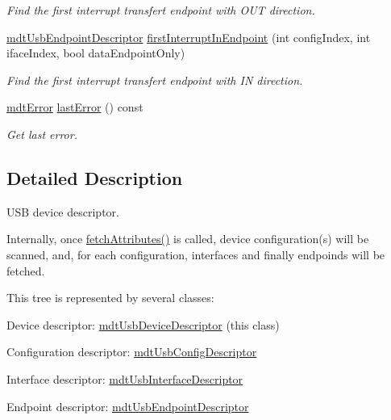 \begin{DoxyCompactItemize}
\begin{DoxyCompactList}\small\item\em Find the first interrupt transfert endpoint with O\-U\-T direction. \end{DoxyCompactList}\item 
\hyperlink{classmdt_usb_endpoint_descriptor}{mdt\-Usb\-Endpoint\-Descriptor} \hyperlink{classmdt_usb_device_descriptor_a0b3d8ac4414e2caec9d1fc81cba223f4}{first\-Interrupt\-In\-Endpoint} (int config\-Index, int iface\-Index, bool data\-Endpoint\-Only)
\begin{DoxyCompactList}\small\item\em Find the first interrupt transfert endpoint with I\-N direction. \end{DoxyCompactList}\item 
\hyperlink{classmdt_error}{mdt\-Error} \hyperlink{classmdt_usb_device_descriptor_a7f3f33bbd6a010aa7da6540303b59bd3}{last\-Error} () const 
\begin{DoxyCompactList}\small\item\em Get last error. \end{DoxyCompactList}\end{DoxyCompactItemize}


\subsection{Detailed Description}
U\-S\-B device descriptor. 

Internally, once \hyperlink{classmdt_usb_device_descriptor_ae228620cd18a24649f02cba84a0dc1c8}{fetch\-Attributes()} is called, device configuration(s) will be scanned, and, for each configuration, interfaces and finally endpoinds will be fetched.

This tree is represented by several classes\-:
\begin{DoxyItemize}
\item Device descriptor\-: \hyperlink{classmdt_usb_device_descriptor}{mdt\-Usb\-Device\-Descriptor} (this class)
\item Configuration descriptor\-: \hyperlink{classmdt_usb_config_descriptor}{mdt\-Usb\-Config\-Descriptor}
\item Interface descriptor\-: \hyperlink{classmdt_usb_interface_descriptor}{mdt\-Usb\-Interface\-Descriptor}
\item Endpoint descriptor\-: \hyperlink{classmdt_usb_endpoint_descriptor}{mdt\-Usb\-Endpoint\-Descriptor}
\end{DoxyItemize}

